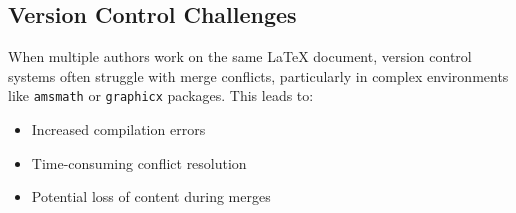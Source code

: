\subsection{Version Control Challenges}

When multiple authors work on the same LaTeX document, version control systems often 
struggle with merge conflicts, particularly in complex environments like \texttt{amsmath} 
or \texttt{graphicx} packages. This leads to:
\begin{itemize}
    \item Increased compilation errors
    \item Time-consuming conflict resolution
    \item Potential loss of content during merges
\end{itemize} 